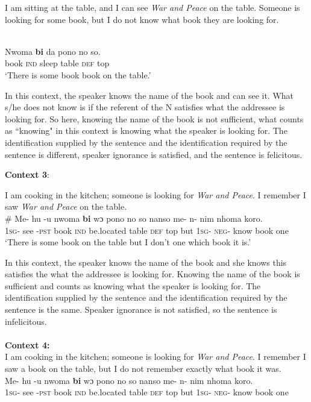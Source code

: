 \documentclass[output=paper,modfonts]{langsci/langscibook}
\begin{document}
I am sitting at the table, and I can see \emph{\emph{War and Peace}} on the table. Someone is looking for some book, but I do not know what book they are looking for.  

\ea\label{ex62}\\
\gll Nwoma \textbf{bi} da pono no so.\\
	      book \textsc{ind}  sleep table \textsc{def} top\\

\glt `There is some book book on the table.'

 \z In this context, the speaker knows the name of the book and can see it. What s/he does not know is if the referent of the N satisfies what the addressee is looking for. So here, knowing the name of the book is not sufficient, what counts as ``knowing" in this context is knowing what the speaker is looking for.  The identification supplied by the sentence and the identification required by the sentence is different, speaker ignorance is satisfied, and the sentence is felicitous.
 
\textbf{Context 3}:

I am cooking in the kitchen; someone is looking for \emph{War and Peace}. I remember I saw \emph{War and Peace} on the table.
\ea\label{ex62}\\
\gll \# Me- hu -u nwoma \textbf{bi} wɔ pono no so nanso me- n- nim nhoma koro.\\
	     {} \textsc{1sg}- see -\textsc{pst}  book \textsc{ind}  be.located table \textsc{def}  top but \textsc{1sg}- \textsc{neg}- know book one\\

\glt `There is some book on the table but I don't one which book it is.'

 \z In this context, the speaker knows the name of the book and she knows this satisfies the what the addressee is looking for. Knowing the name of the book is sufficient and counts as knowing what the speaker is looking for. The identification supplied by the sentence and the identification required by the sentence is the same. Speaker ignorance is not satisfied, so the sentence is infelicitous.  \\\\
\textbf{Context 4:} \\
I am cooking in the kitchen; someone is looking for \emph{War and Peace}. I remember I saw a book on the table, but I do not remember exactly what book it was.
\ea\label{ex62}\\
\gll Me- hu -u nwoma \textbf{bi} wɔ pono no so nanso me- n- nim nhoma koro.\\
	     \textsc{1sg}- see -\textsc{pst}  book \textsc{ind}  be.located table \textsc{def} top but \textsc{1sg}- \textsc{neg}- know book one\\
\end{document}
